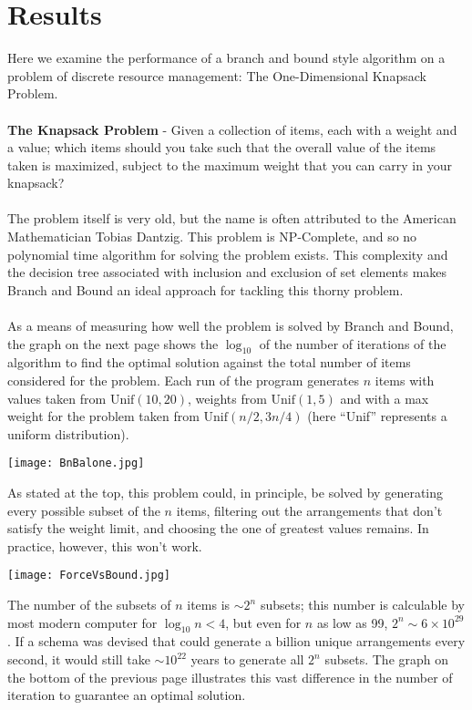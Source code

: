 \documentclass{article}
\newcommand{\distrib}[2]{\text{#1}\left(#2\right)}
\begin{document}
\section*{Results}
Here we examine the performance of a branch and bound style algorithm on a 
problem of discrete resource management: The One-Dimensional Knapsack Problem.\\\\
\textbf{The Knapsack Problem} - Given a collection of items, each with a weight and 
a value; which items should you take such that the overall value of the items taken is
maximized, subject to the maximum weight that you can carry in your knapsack? \\\\
The problem itself is very old, but the name is often attributed to the
American Mathematician Tobias Dantzig. This problem is NP-Complete, and so no 
polynomial time algorithm for solving the problem exists. This complexity and the 
decision tree associated with inclusion and exclusion of set elements makes Branch and 
Bound an ideal approach for tackling this thorny problem.\\\\
As a means of measuring how well the problem is solved by Branch and Bound, the graph 
on the next page shows the $\log_{10}$ of the number of 
iterations of the algorithm to find the 
optimal solution against the total number of items considered for the problem. Each 
run of the program generates $n$ items with values taken from $\distrib{Unif}{10, 20}$, 
weights from $\distrib{Unif}{1,5}$ and with a max weight for the problem taken from 
$\distrib{Unif}{n/2, 3n/4}$ (here ``Unif'' represents a uniform distribution). 


\begin{center}
\texttt{[image: BnBalone.jpg]}
\end{center}
As stated at the top, this problem could, in principle, be solved by generating every 
possible subset of the $n$ items, filtering out the arrangements that don't satisfy the
weight limit, and choosing the one of greatest values remains. In practice, however, 
this won't work. 

\begin{center}
\texttt{[image: ForceVsBound.jpg]}
\end{center}
The number of the subsets of $n$ items is $\sim 2^n$ subsets; this number is 
calculable by most modern computer for $\log_{10} n < 4$, but even for $n$ as
low as 99, $2^n \sim 6 \times 10^{29}$. If a schema was devised that 
could generate a billion unique arrangements every second, it would still take 
$\sim 10^{22}$ years to generate all $2^n$ subsets. The graph on the bottom of 
the previous page illustrates this vast difference in the number of iteration 
to guarantee an optimal solution.  
\end{document}
